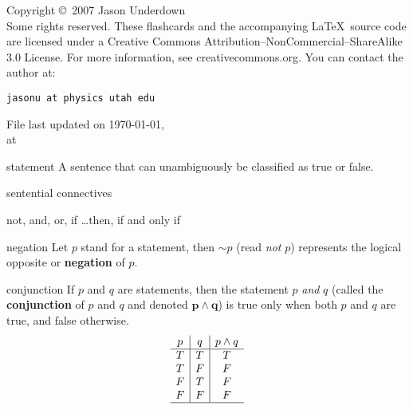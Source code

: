 \documentclass[avery5371,grid]{flashcards}
\begin{document}
\begin{flashcard}{Copyright \copyright \,
2007 Jason Underdown \\Some rights reserved.}
These flashcards and the accompanying \LaTeX \, source code are licensed
under a Creative Commons Attribution--NonCommercial--ShareAlike 3.0 License.
For more information, see creativecommons.org.
You can contact the author at:
\begin{center}
\begin{small}\tt jasonu at physics utah edu\end{small}

\medskip
File last updated on \today, \\
at \currenttime
\end{center}
\end{flashcard}


\begin{flashcard}[Definition]{statement}
A sentence that can unambiguously be classified as true or false.
\end{flashcard}

\begin{flashcard}[Definition]{sentential connectives}
\begin{center}
not, and, or, if \ldots then, if and only if
\end{center}
\end{flashcard}

\begin{flashcard}[Definition]{negation}
Let $p$ stand for a statement, then $\sim p$ (read \textit{not} $p$)
represents the logical opposite or \textbf{negation} of $p$.
\end{flashcard}

\begin{flashcard}[Definition]{conjunction}
If $p$ and $q$ are statements, then the statement
$p$ \textit{and} $q$ (called the \textbf{conjunction}
of $p$ and $q$ and denoted $\mathbf{p \wedge q}$)
is true only when both $p$ and $q$ are true, and false otherwise.
\begin{equation*}
\begin{array}{c|c|c}
p & q & p \wedge q \\
\hline
T & T & T\\ 
T & F & F\\ 
F & T & F\\ 
F & F & F\\
\hline
\end{array}
\end{equation*}
\end{flashcard}
\end{document}
